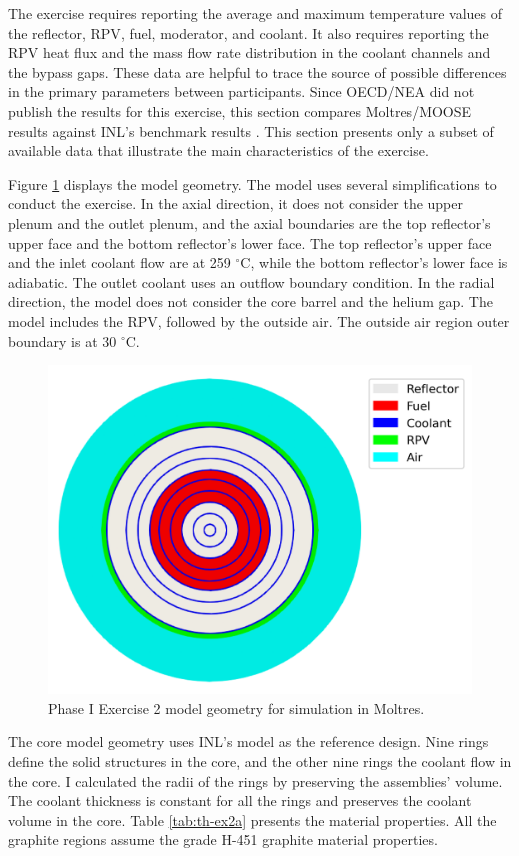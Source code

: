 The exercise requires reporting the average and maximum temperature values of the reflector, \gls{RPV}, fuel, moderator, and coolant.
It also requires reporting the RPV heat flux and the mass flow rate distribution in the coolant channels and the bypass gaps.
These data are helpful to trace the source of possible differences in the primary parameters between participants.
Since OECD/NEA did not publish the results for this exercise, this section compares Moltres/MOOSE results against INL's benchmark results \cite{strydom_inl_2013}.
This section presents only a subset of available data that illustrate the main characteristics of the exercise.

Figure \ref{fig:ex2a-1st-model} displays the model geometry.
The model uses several simplifications to conduct the exercise.
In the axial direction, it does not consider the upper plenum and the outlet plenum, and the axial boundaries are the top reflector's upper face and the bottom reflector's lower face.
The top reflector's upper face and the inlet coolant flow are at 259 $^{\circ}$C, while the bottom reflector's lower face is adiabatic.
The outlet coolant uses an outflow boundary condition.
In the radial direction, the model does not consider the core barrel and the helium gap.
The model includes the RPV, followed by the outside air.
The outside air region outer boundary is at 30 $^{\circ}$C.

\begin{figure}[htbp!]
  \centering
  \includegraphics[width=0.45\linewidth]{figures-thermal/ex2a-meshD2}
  \hfill
  \caption{Phase I Exercise 2 model geometry for simulation in Moltres.}
  \label{fig:ex2a-1st-model}
\end{figure}

The core model geometry uses INL's model as the reference design.
Nine rings define the solid structures in the core, and the other nine rings the coolant flow in the core.
I calculated the radii of the rings by preserving the assemblies' volume.
The coolant thickness is constant for all the rings and preserves the coolant volume in the core.
Table \ref{tab:th-ex2a} presents the material properties.
All the graphite regions assume the grade H-451 graphite material properties.


